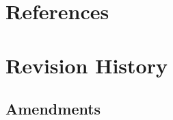 \documentclass[a4paper]{arrowhead}
\begin{document}
\section{References}
\label{sec:refs}
\renewcommand{\refname}{}
\vspace*{-1.2cm}
\nocite{ah5core,ah5docs,ah5supportup,ah5srgo,delsing2017,sysmlprofile}



\newpage
\section{Revision History}
\label{sec:history}
\subsection{Amendments}
\end{document}
